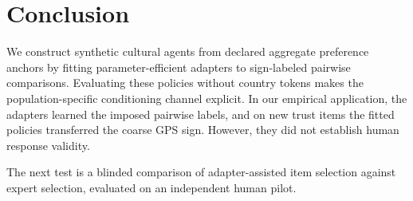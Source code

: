 \section{Conclusion}\label{sec:conclusion}
We construct synthetic cultural agents from declared aggregate preference anchors by fitting parameter-efficient adapters to sign-labeled pairwise comparisons. Evaluating these policies without country tokens makes the population-specific conditioning channel explicit. In our empirical application, the adapters learned the imposed pairwise labels, and on new trust items the fitted policies transferred the coarse GPS sign. However, they did not establish human response validity.

The next test is a blinded comparison of adapter-assisted item selection against expert selection, evaluated on an independent human pilot.
